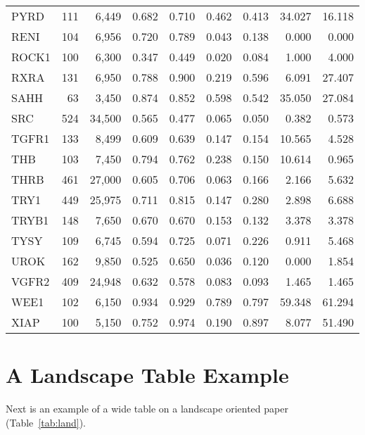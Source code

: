 \begin{center}
\begin{footnotesize}
\begin{longtable}{lrrrrrrrr}
			PYRD   & 111   & 6,449    & 0.682   & 0.710   & 0.462   & 0.413   & 34.027  & 16.118 \\
			RENI   & 104   & 6,956    & 0.720   & 0.789   & 0.043   & 0.138   & 0.000   & 0.000  \\
			ROCK1  & 100   & 6,300    & 0.347   & 0.449   & 0.020   & 0.084   & 1.000   & 4.000  \\
			RXRA   & 131   & 6,950    & 0.788   & 0.900   & 0.219   & 0.596   & 6.091   & 27.407 \\
			SAHH   & 63    & 3,450    & 0.874   & 0.852   & 0.598   & 0.542   & 35.050  & 27.084 \\
			SRC    & 524   & 34,500   & 0.565   & 0.477   & 0.065   & 0.050   & 0.382   & 0.573  \\
			TGFR1  & 133   & 8,499    & 0.609   & 0.639   & 0.147   & 0.154   & 10.565  & 4.528  \\
			THB    & 103   & 7,450    & 0.794   & 0.762   & 0.238   & 0.150   & 10.614  & 0.965  \\
			THRB   & 461   & 27,000   & 0.605   & 0.706   & 0.063   & 0.166   & 2.166   & 5.632  \\
			TRY1   & 449   & 25,975   & 0.711   & 0.815   & 0.147   & 0.280   & 2.898   & 6.688  \\
			TRYB1  & 148   & 7,650    & 0.670   & 0.670   & 0.153   & 0.132   & 3.378   & 3.378  \\
			TYSY   & 109   & 6,745    & 0.594   & 0.725   & 0.071   & 0.226   & 0.911   & 5.468  \\
			UROK   & 162   & 9,850    & 0.525   & 0.650   & 0.036   & 0.120   & 0.000   & 1.854  \\
			VGFR2  & 409   & 24,948   & 0.632   & 0.578   & 0.083   & 0.093   & 1.465   & 1.465  \\
			WEE1   & 102   & 6,150    & 0.934   & 0.929   & 0.789   & 0.797   & 59.348  & 61.294 \\
			XIAP   & 100   & 5,150    & 0.752   & 0.974   & 0.190   & 0.897   & 8.077   & 51.490 \\
			\bottomrule
			
		\end{longtable}
	\end{footnotesize}
	\endgroup
\end{center}

\blindtext

\section{A Landscape Table Example}
Next is an example of a wide table on a landscape oriented paper (Table~\ref{tab:land}).

